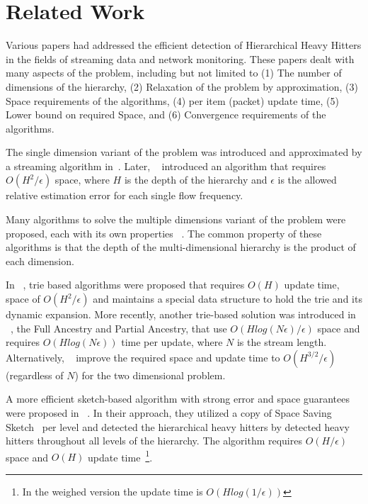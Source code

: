 \section{Related Work}
Various papers had addressed the efficient detection of Hierarchical Heavy Hitters in the fields of streaming data and network monitoring. These papers dealt with many aspects of the problem, including but not limited to (1) The number of dimensions of the hierarchy, (2) Relaxation of the problem by approximation, (3) Space requirements of the algorithms, (4) per item (packet) update time, (5) Lower bound on required Space, and (6) Convergence requirements of the algorithms.

The single dimension variant of the problem was introduced
and approximated by a streaming algorithm in~\cite{HHHInStreams}.
Later, ~\cite{separator} introduced an algorithm that requires $O(H^2/\epsilon)$ space, where $H$ is the depth of the hierarchy and $\epsilon$ is the allowed relative estimation error for each single flow frequency.

Many algorithms to solve the multiple dimensions variant of the problem were proposed, each with its own properties ~\cite{HHHOnline, SpaceSaving, HHHInStreams-MultiDimension, weightedCircuits, MultiDimensionHHH, lowerboundsonMultiDimension}. The common property of these algorithms is that the depth of the multi-dimensional hierarchy is the product of each dimension.

In ~\cite{HHHOnline}, trie based algorithms were proposed that requires $O(H)$ update time, space of $O(H^2/\epsilon)$ and maintains a special data structure to hold the trie and its dynamic expansion. More recently, another trie-based solution was introduced in ~\cite{HHHInStreams-MultiDimension}, the Full Ancestry and Partial Ancestry, that use $O(Hlog(N\epsilon)/\epsilon)$ space and requires $O(Hlog(N\epsilon))$ time per update, where $N$ is the stream length. Alternatively, ~\cite{weightedCircuits} improve the required space and update time to $O(H^{3/2}/\epsilon)$ (regardless of $N$) for the two dimensional problem.

A more efficient sketch-based algorithm with strong error and space guarantees were proposed in ~\cite{SpaceSaving}. In their approach, they utilized a copy of Space Saving Sketch~\cite{metwally2005efficient} per level and detected the hierarchical heavy hitters by detected heavy hitters throughout all levels of the hierarchy. The algorithm requires $O(H/\epsilon)$ space and $O(H)$ update time~\footnote{In the weighed version the update time is $O(Hlog(1/\epsilon))$}.

